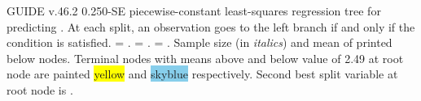 \documentclass[12pt]{article}
\begin{document}
 \begin{center}
 \end{center}
GUIDE v.46.2 0.250-SE
piecewise-constant least-squares regression tree
for predicting \texttt{}.
At each split, an observation goes to the left branch 
 if and only if the condition is satisfied.
\texttt{} = \texttt{}.
\texttt{} = \texttt{}.
\texttt{} = \texttt{}.
Sample size (in \emph{italics}) and mean of \texttt{} printed below nodes.
 Terminal nodes with means above and below value of  2.49 at root node are painted \colorbox{yellow}{yellow} and \colorbox{skyblue}{skyblue} respectively.
 Second best split variable at root node is \texttt{}.
 
\end{document}
